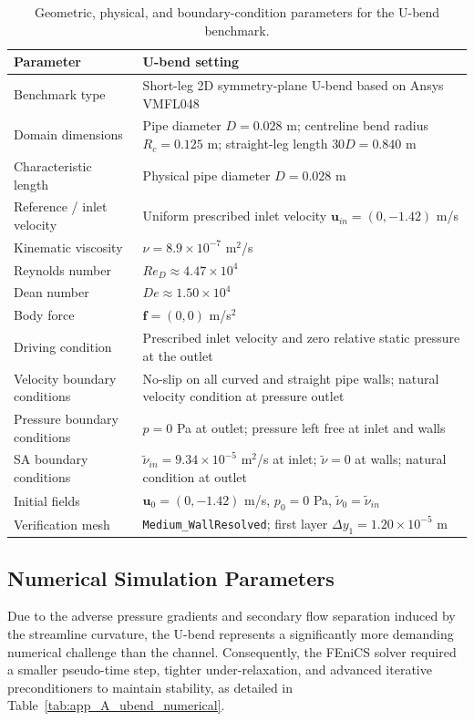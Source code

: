 \begin{table}[htbp]
	\centering
	\footnotesize
	\caption{Geometric, physical, and boundary-condition parameters for the U-bend benchmark.}
	\label{tab:app_A_ubend_physical}
	\renewcommand{\arraystretch}{1.2}
	\begin{tabularx}{\textwidth}{l X}
		\hline
		\textbf{Parameter} & \textbf{U-bend setting} \\
		\hline
		Benchmark type & Short-leg 2D symmetry-plane U-bend based on Ansys VMFL048 \\
		Domain dimensions & Pipe diameter $D=0.028$ m; centreline bend radius $R_c=0.125$ m; straight-leg length $30D=0.840$ m \\
		Characteristic length & Physical pipe diameter $D=0.028$ m \\
		Reference / inlet velocity & Uniform prescribed inlet velocity $\mathbf{u}_{in}=(0,-1.42)$ m/s \\
		Kinematic viscosity & $\nu = 8.9 \times 10^{-7}$ m$^2$/s \\
		Reynolds number & $Re_D \approx 4.47 \times 10^4$ \\
		Dean number & $De \approx 1.50 \times 10^4$ \\
		Body force & $\mathbf{f}=(0,0)$ m/s$^2$ \\
		Driving condition & Prescribed inlet velocity and zero relative static pressure at the outlet \\
		Velocity boundary conditions & No-slip on all curved and straight pipe walls; natural velocity condition at pressure outlet \\
		Pressure boundary conditions & $p=0$ Pa at outlet; pressure left free at inlet and walls \\
		SA boundary conditions & $\tilde{\nu}_{in}=9.34 \times 10^{-5}$ m$^2$/s at inlet; $\tilde{\nu}=0$ at walls; natural condition at outlet \\
			Initial fields & $\mathbf{u}_0=(0,-1.42)$ m/s, $p_0=0$ Pa, $\tilde{\nu}_0=\tilde{\nu}_{in}$ \\
			Verification mesh & \texttt{Medium\_WallResolved}; first layer $\Delta y_1 = 1.20 \times 10^{-5}$ m \\
		\hline
	\end{tabularx}
\end{table}

\subsection{Numerical Simulation Parameters}
\label{subsec:app_A_ubend_numerical}
Due to the adverse pressure gradients and secondary flow separation induced by the streamline curvature, the U-bend represents a significantly more demanding numerical challenge than the channel. Consequently, the FEniCS solver required a smaller pseudo-time step, tighter under-relaxation, and advanced iterative preconditioners to maintain stability, as detailed in Table~\ref{tab:app_A_ubend_numerical}.

